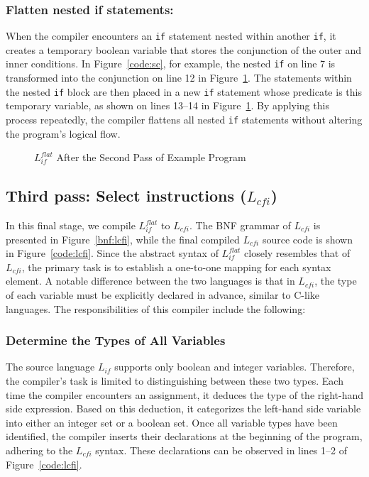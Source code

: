 \subsubsection{Flatten nested if statements:}
When the compiler encounters an \texttt{if} statement nested within another \texttt{if}, it creates a temporary boolean variable that stores the conjunction of the outer and inner conditions. In Figure~\ref{code:sc}, for example, the nested \texttt{if} on line 7 is transformed into the conjunction on line 12 in Figure~\ref{code:flat}. The statements within the nested \texttt{if} block are then placed in a new \texttt{if} statement whose predicate is this temporary variable, as shown on lines 13–14 in Figure~\ref{code:flat}. By applying this process repeatedly, the compiler flattens all nested \texttt{if} statements without altering the program’s logical flow.

\begin{figure}[h!]
	
	\caption{$L_{if}^{flat}$ After the Second Pass of Example Program}
	\label{code:flat}
\end{figure}


\subsection{Third pass: Select instructions ($L_{cfi}$)}

In this final stage, we compile $L_{if}^{flat}$ to $L_{cfi}$. The BNF grammar of $L_{cfi}$ is presented in Figure~\ref{bnf:lcfi}, while the final compiled $L_{cfi}$ source code is shown in Figure~\ref{code:lcfi}. Since the abstract syntax of $L_{if}^{flat}$ closely resembles that of $L_{cfi}$, the primary task is to establish a one-to-one mapping for each syntax element. A notable difference between the two languages is that in $L_{cfi}$, the type of each variable must be explicitly declared in advance, similar to C-like languages. The responsibilities of this compiler include the following:

\subsubsection{Determine the Types of All Variables}
The source language $L_{if}$ supports only boolean and integer variables. Therefore, the compiler's task is limited to distinguishing between these two types. Each time the compiler encounters an assignment, it deduces the type of the right-hand side expression. Based on this deduction, it categorizes the left-hand side variable into either an integer set or a boolean set. Once all variable types have been identified, the compiler inserts their declarations at the beginning of the program, adhering to the $L_{cfi}$ syntax. These declarations can be observed in lines 1–2 of Figure~\ref{code:lcfi}.

